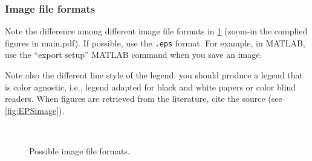 \documentclass[11pt,a4paper,oneside]{article}
\begin{document}
\subsubsection{Image file formats}\label{subsubsec:imagefileformats}
Note the difference among different image file formats in \cref{fig:possibleimagefileformats} (zoom-in the complied figures in main.pdf). If possible, use the \verb|.eps| format. For example, in MATLAB, use the ``export setup'' MATLAB command when you save an image. 

\noindent Note also the different line style of the legend: you should produce a legend that is color agnostic, i.e., legend adapted for black and white papers or color blind readers. When figures are retrieved from the literature, cite the source (see \cref{fig:EPSimage}).
\begin{figure}[htp]
    \centering
    \quad
    \\
    \caption{Possible image file formats.\label{fig:possibleimagefileformats}}
\end{figure}
\end{document}
